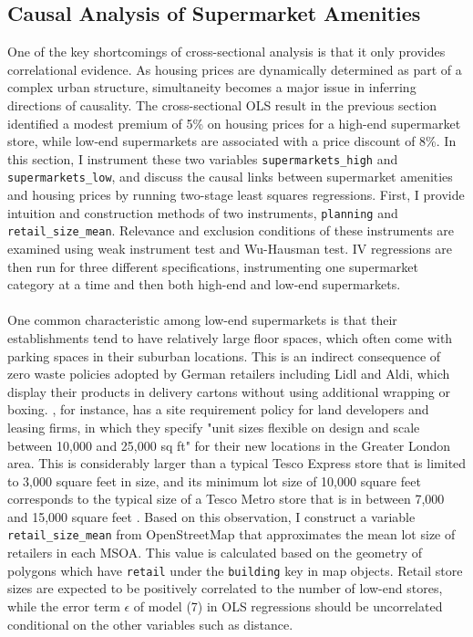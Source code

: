 \documentclass{article}
\begin{document}
\subsection{Causal Analysis of Supermarket Amenities} \label{subsection:iv}
One of the key shortcomings of cross-sectional analysis is that it only provides correlational evidence. As housing prices are dynamically determined as part of a complex urban structure, simultaneity becomes a major issue in inferring directions of causality. The cross-sectional OLS result in the previous section identified a modest premium of 5\% on housing prices for a high-end supermarket store, while low-end supermarkets are associated with a price discount of 8\%. In this section, I instrument these two variables \texttt{supermarkets\_high} and \texttt{supermarkets\_low}, and discuss the causal links between supermarket amenities and housing prices by running two-stage least squares regressions. First, I provide intuition and construction methods of two instruments, \texttt{planning} and \texttt{retail\_size\_mean}. Relevance and exclusion conditions of these instruments are examined using weak instrument test and Wu-Hausman test. IV regressions are then run for three different specifications, instrumenting one supermarket category at a time and then both high-end and low-end supermarkets.\\\\
One common characteristic among low-end supermarkets is that their establishments tend to have relatively large floor spaces, which often come with parking spaces in their suburban locations. This is an indirect consequence of zero waste policies adopted by German retailers including Lidl and Aldi, which display their products in delivery cartons without using additional wrapping or boxing. \citet{LidlUK2018IntroduceExpand}, for instance, has a site requirement policy for land developers and leasing firms, in which they specify "unit sizes flexible on design and scale between 10,000 and 25,000 sq ft" for their new locations in the Greater London area. This is considerably larger than a typical Tesco Express store that is limited to 3,000 square feet in size, and its minimum lot size of 10,000 square feet corresponds to the typical size of a Tesco Metro store that is in between 7,000 and 15,000 square feet \citep{Vasquez-Nicholson2016UK2013}. Based on this observation, I construct a variable \texttt{retail\_size\_mean} from OpenStreetMap that approximates the mean lot size of retailers in each MSOA. This value is calculated based on the geometry of polygons which have \texttt{retail} under the \texttt{building} key in map objects. Retail store sizes are expected to be positively correlated to the number of low-end stores, while the error term $\epsilon$ of model (7) in OLS regressions should be uncorrelated conditional on the other variables such as distance.\\\\
\end{document}
